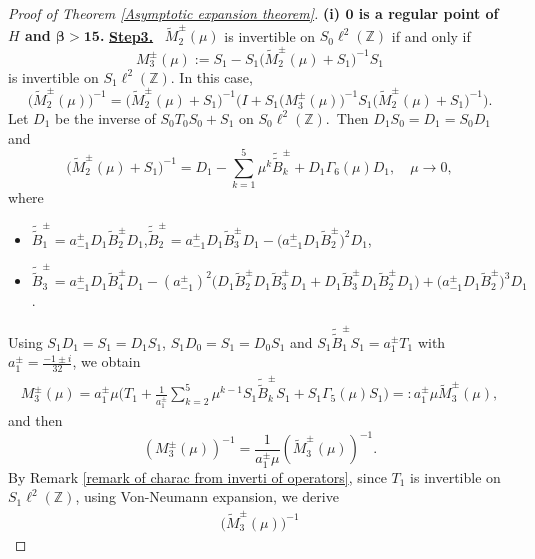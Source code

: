 \documentclass[reqno, 11pt]{amsart}
\newcommand\Z{\mathbb{Z}}
\numberwithin{equation}{section}
\begin{document}
\begin{proof}[Proof of Theorem {\rm\ref{Asymptotic expansion theorem}}]{\bf{(i) ${\bm{0}}$ is a regular point of $H$ and {$\bm{\beta>15}$}.}}
\vskip0.1cm
{\bf{\underline{Step3.}}} \ $\widetilde{M}_{2}^{\pm}(\mu)$ is invertible on $S_0\ell^{2}(\Z)$ if and only if $$ M^{\pm}_{3}(\mu):=S_1-S_1\big(\widetilde{M}_{2}^{\pm}(\mu)+S_1\big)^{-1}S_1$$ is invertible on $S_1\ell^{2}(\Z)$. In this case,
\begin{equation}\label{Relat of M2 tuta and M3}
\big(\widetilde{M}_{2}^{\pm}(\mu)\big)^{-1}=\big(\widetilde{M}_{2}^{\pm}(\mu)+S_1\big)^{-1}\Big(I+S_1\big(M^{\pm}_{3}(\mu)\big)^{-1}S_1\big(\widetilde{M}_{2}^{\pm}(\mu)+S_1\big)^{-1}\Big).
\end{equation}
Let $D_1$ be the inverse of $S_0T_0S_0+S_1$ on $S_0\ell^2(\Z)$.~Then $D_1S_0=D_1=S_0D_1$ and
\begin{equation}\label{expre of Bpm ttuta}
\big(\widetilde{M}_{2}^{\pm}(\mu)+S_1\big)^{-1}=D_1-\sum\limits_{k=1}^{5}\mu^{k}\tilde{\tilde{B}}^{\pm}_{k}+D_1\Gamma_6(\mu)D_1,\quad\mu\rightarrow0,
\end{equation}
where
\begin{itemize}
\item $\tilde{\tilde{B}}^{\pm}_{1}=a^{\pm}_{-1}D_1\widetilde{B}^{\pm}_2D_1$,\quad$\tilde{\tilde{B}}^{\pm}_{2}=a^{\pm}_{-1}D_1\widetilde{B}^{\pm}_3D_1-\big(a^{\pm}_{-1}D_1\widetilde{B}^{\pm}_2\big)^2D_1$,
\vskip0.2cm
\item $\tilde{\tilde{B}}^{\pm}_{3}=a^{\pm}_{-1}D_1\widetilde{B}^{\pm}_4D_1-{(a^{\pm}_{-1})}^2\big(D_1\widetilde{B}^{\pm}_2D_1\widetilde{B}^{\pm}_3D_1+D_1\widetilde{B}^{\pm}_3D_1\widetilde{B}^{\pm}_2D_1\big)+\big(a^{\pm}_{-1}D_1\widetilde{B}^{\pm}_2\big)^3D_1$.
\end{itemize}
Using $S_1D_1=S_1=D_1S_1$, $S_1D_0=S_1=D_0S_1$ and $S_1\tilde{\tilde{B}}^{\pm}_{1}S_1=a^{\pm}_{1}T_1$ with $a^{\pm}_{1}=\frac{-1\pm i}{32}$, we obtain
\begin{align*}
M^{\pm}_3(\mu)=a^{\pm}_{1}\mu\Big(T_1+\frac{1}{a^{\pm}_{1}}\sum\limits_{k=2}^{5}\mu^{k-1}S_1\tilde{\tilde{B}}^{\pm}_{k}S_1+S_1\Gamma_5(\mu)S_1\Big)=:a^{\pm}_{1}\mu\widetilde{M}^{\pm}_3(\mu),
\end{align*}
and then
\begin{equation}\label{Relat of M3 and M3 tuta}
\left(M^{\pm}_3(\mu)\right)^{-1}=\frac{1}{a^{\pm}_{1}\mu}\left(\widetilde{M}_{3}^{\pm}(\mu)\right)^{-1}.
\end{equation}
By Remark \ref{remark of charac from inverti of operators}, since $T_1$ is invertible on $S_1\ell^2(\Z)$, using Von-Neumann expansion, we derive
\begin{align}\label{inverse of Mtuta3}
\big(\widetilde{M}_{3}^{\pm}(\mu)\big)^{-1}

\end{align}
\end{proof}
\end{document}
